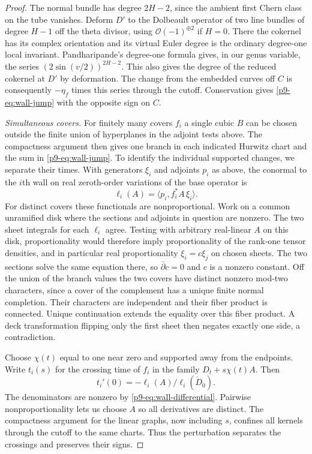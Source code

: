 \begin{proof}
The normal bundle has degree $2H-2$, since the ambient first Chern
class on the tube vanishes. Deform $D'$ to the Dolbeault operator of
two line bundles of degree $H-1$ off the theta divisor, using
$\mathcal O(-1)^{\oplus2}$ if $H=0$. There the cokernel has its
complex orientation and its virtual Euler degree is the ordinary
degree-one local invariant. Pandharipande's degree-one formula
\cite[Theorem~2]{pandhodge} gives, in our genus variable, the series
$(2\sin(v/2))^{2H-2}$. This also gives the degree of the reduced
cokernel at $D'$ by deformation. The change from the embedded curves
off $C$ is consequently $-\eta_f$ times this series through the
cutoff. Conservation gives \eqref{p9-eq:wall-jump} with the opposite
sign on $C$.

\smallskip
\noindent\emph{Simultaneous covers.}
For finitely many covers $f_i$ a single cubic $B$ can be chosen
outside the finite union of hyperplanes in the adjoint tests above.
The compactness argument then gives one branch in each indicated
Hurwitz chart and the sum in \eqref{p9-eq:wall-jump}. To identify the
individual supported changes, we separate their times. With generators
$\xi_i$ and adjoints $p_i$ as above, the conormal to the $i$th wall
on real zeroth-order variations of the base operator is
\[
                   \ell_i(A)=\langle p_i,f_i^*A\,\xi_i\rangle .
\]
For distinct covers these functionals are nonproportional. Work on a
common unramified disk where the sections and adjoints in question
are nonzero. The two sheet integrals for each $\ell_i$ agree. Testing
with arbitrary real-linear $A$ on this disk, proportionality would
therefore imply proportionality of the rank-one tensor densities,
and in particular real proportionality $\xi_i=c\xi_j$ on chosen
sheets. The two sections solve the same equation there, so
$\bar\partial c=0$ and $c$ is a nonzero constant. Off the union of
the branch values the two covers have distinct nonzero mod-two
characters, since a cover of the complement has a unique finite
normal completion. Their characters are independent and their fiber
product is connected. Unique continuation extends the equality over
this fiber product. A deck transformation flipping only the first
sheet then negates exactly one side, a contradiction.

Choose $\chi(t)$ equal to one near zero and supported away from the
endpoints. Write $t_i(s)$ for the crossing time of $f_i$ in the
family $D_t+s\chi(t)A$. Then
\[
              t_i'(0)=-\ell_i(A)/\ell_i(\dot D_0).
\]
The denominators
are nonzero by \eqref{p9-eq:wall-differential}. Pairwise
nonproportionality lets us choose $A$ so all derivatives are distinct.
The compactness argument for the linear graphs, now including $s$,
confines all kernels through the cutoff to the same charts. Thus the
perturbation separates the crossings and preserves their signs.


\end{proof}

